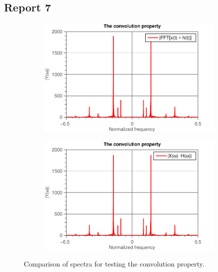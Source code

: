\documentclass[11pt,titlepage]{report}
\begin{document}
\subsection{Report 7}
\begin{figure}[H]
	\centering
	\begin{subfigure}{0.49\textwidth}
		\includegraphics[width=\textwidth]{../../deliverable-7-resources/figures/ass-1/report-7/ass-1-report-7-convolution.pdf}
	\end{subfigure}
	\begin{subfigure}{0.49\textwidth}
		\includegraphics[width=\textwidth]{../../deliverable-7-resources/figures/ass-1/report-7/ass-1-report-7-multiplication.pdf}
	\end{subfigure}
	\caption{Comparison of spectra for testing the convolution property.}
	\label{fig:rep7-convolution}
\end{figure}
\end{document}
